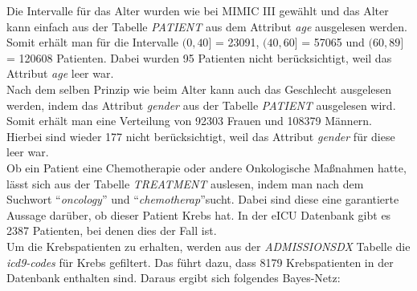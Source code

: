 \documentclass[german,version-2020-11]{uzl-thesis}
\begin{document}
Die Intervalle für das Alter wurden wie bei MIMIC III gewählt und das Alter kann einfach aus der Tabelle \textit{PATIENT} aus dem Attribut \textit{age} ausgelesen werden. Somit erhält man für die Intervalle  $(0,40]$ = 23091,  $(40,60]$ = 57065 und $(60,89]$ = 120608 Patienten. Dabei wurden 95 Patienten nicht berücksichtigt, weil das Attribut \textit{age} leer war.\\ 
Nach dem selben Prinzip wie beim Alter kann auch das Geschlecht ausgelesen werden, indem das Attribut \textit{gender} aus der Tabelle \textit{PATIENT} ausgelesen wird. Somit erhält man eine Verteilung von 92303 Frauen und 108379 Männern. Hierbei sind wieder 177 nicht berücksichtigt, weil das Attribut \textit{gender} für diese leer war. \\
Ob ein Patient eine Chemotherapie oder andere Onkologische Maßnahmen hatte, lässt sich aus der Tabelle \textit{TREATMENT } auslesen, indem man nach dem Suchwort \enquote{\textit{oncology}} und  \enquote{\textit{chemotherap}}sucht. Dabei sind diese eine garantierte Aussage darüber, ob dieser Patient Krebs hat. In der eICU Datenbank gibt es 2387 Patienten, bei denen dies der Fall ist. \\ 
Um die  Krebspatienten zu erhalten, werden aus der \textit{ADMISSIONSDX} Tabelle die \textit{icd9-codes} für Krebs gefiltert. Das führt dazu, dass 8179 Krebspatienten in der Datenbank enthalten sind. 
Daraus ergibt sich folgendes Bayes-Netz:
\end{document}
